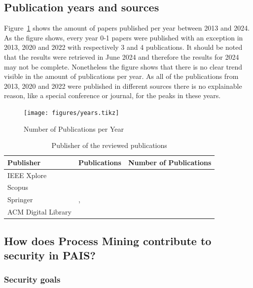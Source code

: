 \documentclass[runningheads]{llncs}
\begin{document}
\subsection{Publication years and sources}\label{years}
Figure~\ref{per_years} shows the amount of papers published per year between 2013 and 2024. As the figure shows, every year 0-1 papers were published with an exception in 2013, 2020 and 2022 with respectively 3 and 4 publications. It should be noted that the
results were retrieved in June 2024 and therefore the results for 2024 may not be complete. Nonetheless the figure shows that there is no clear trend visible in the amount of publications per year. As all of the publications from 2013, 2020 and 2022 were
published in different sources there is no explainable reason, like a special conference or journal, for the peaks in these years.\\
\begin{figure}
    \centering
    \texttt{[image: figures/years.tikz]}
    \caption{Number of Publications per Year}
    \label{per_years}
\end{figure}
\begin{table}
    \centering
    \caption{Publisher of the reviewed publications}
    \begin{tabular}{ | l | l | l | }
        \hline
        \textbf{Publisher}  & \textbf{Publications} & \textbf{Number of Publications} \\
        \hline
        \hline
        IEEE Xplore         &                       &                               \\
        \hline
        Scopus              &                       &                                \\
        \hline
        Springer            & \cite{Breitmayer202411},                       &                                \\
        \hline
        ACM Digital Library &                       &                               \\
        \hline
    \end{tabular}
    \label{sources}
\end{table}
\subsection{How does Process Mining contribute to security in PAIS?}\label{Q1}
\subsubsection{Security goals}\label{goals}
\end{document}
